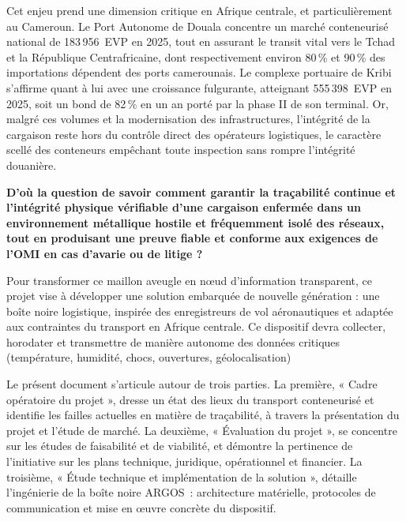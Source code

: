 Cet enjeu prend une dimension critique en Afrique centrale, et particulièrement au Cameroun. Le Port Autonome de Douala concentre un marché conteneurisé national de 183\,956~EVP en 2025\cite{pad2025}, tout en assurant le transit vital vers le Tchad et la République Centrafricaine, dont respectivement environ 80\,\% et 90\,\% des importations dépendent des ports camerounais\cite{corridor2025}. Le complexe portuaire de Kribi s’affirme quant à lui avec une croissance fulgurante, atteignant 555\,398~EVP en 2025, soit un bond de 82\,\% en un an porté par la phase II de son terminal\cite{pak2026}. Or, malgré ces volumes et la modernisation des infrastructures, l’intégrité de la cargaison reste hors du contrôle direct des opérateurs logistiques, le caractère scellé des conteneurs empêchant toute inspection sans rompre l’intégrité douanière.

\textbf{D’où la question de savoir comment garantir la traçabilité continue et l’intégrité physique vérifiable d’une cargaison enfermée dans un environnement métallique hostile et fréquemment isolé des réseaux, tout en produisant une preuve fiable et conforme aux exigences de l’OMI en cas d’avarie ou de litige ?}

Pour transformer ce maillon aveugle en nœud d'information transparent, ce projet vise à développer une solution embarquée de nouvelle génération : une boîte noire logistique, inspirée des enregistreurs de vol aéronautiques et adaptée aux contraintes du transport en Afrique centrale. Ce dispositif devra collecter, horodater et transmettre de manière autonome des données critiques (température, humidité, chocs, ouvertures, géolocalisation)

Le présent document s'articule autour de trois parties. La première, « Cadre opératoire du projet », dresse un état des lieux du transport conteneurisé et identifie les failles actuelles en matière de traçabilité, à travers la présentation du projet et l'étude de marché. La deuxième, « Évaluation du projet », se concentre sur les études de faisabilité et de viabilité, et démontre la pertinence de l'initiative sur les plans technique, juridique, opérationnel et financier. La troisième, « Étude technique et implémentation de la solution », détaille l'ingénierie de la boîte noire ARGOS~: architecture matérielle, protocoles de communication et mise en œuvre concrète du dispositif.

